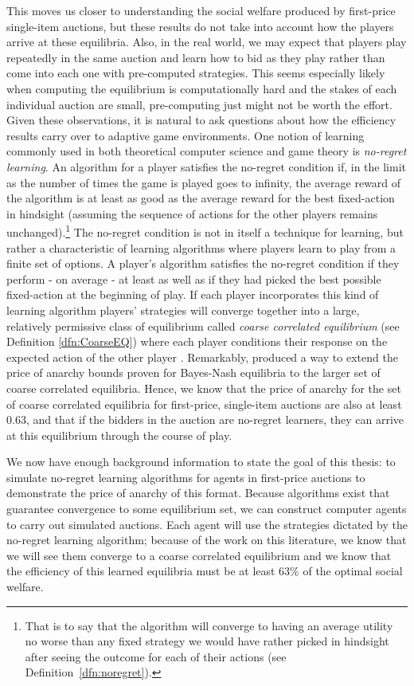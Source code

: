 \documentclass[12pt,twoside]{reedthesis}
\begin{document}
This moves us closer to understanding the social welfare produced by first-price single-item auctions, but these results do not take into account how the players arrive at these equilibria. Also, in the real world, we may expect that players play repeatedly in the same auction and learn how to bid as they play rather than come into each one with pre-computed strategies. This seems especially likely when computing the equilibrium is computationally hard and the stakes of each individual auction are small, pre-computing just might not be worth the effort. Given these observations, it is natural to ask questions about how the efficiency results carry over to adaptive game environments. One notion of learning commonly used in both theoretical computer science and game theory is {\em no-regret learning}. An algorithm for a player satisfies the no-regret condition if, in the limit as the number of times the game is played goes to infinity, the average reward of the algorithm is at least as good as the average reward for the best fixed-action in hindsight (assuming the sequence of actions for the other players remains unchanged).\footnote{That is to say that the algorithm will converge to having an average utility no worse than any fixed strategy we would have rather picked in hindsight after seeing the outcome for each of their actions (see Definition~\ref{dfn:noregret}).} The no-regret condition is not in itself a technique for learning, but rather a characteristic of learning algorithms where players learn to play from a finite set of options. A player's algorithm satisfies the no-regret condition if they perform - on average - at least as well as if they had picked the best possible fixed-action at the beginning of play. If each player incorporates this kind of learning algorithm players' strategies will converge together into a large, relatively permissive class of equilibrium called {\em coarse correlated equilibrium} (see Definition \ref{dfn:CoarseEQ}) where each player conditions their response on the expected action of the other player \citep{Blum2007}. Remarkably, \cite{Roughgarden2017} produced a way to extend the price of anarchy bounds proven for Bayes-Nash equilibria to the larger set of coarse correlated equilibria. Hence, we know that the price of anarchy for the set of coarse correlated equilibria for first-price, single-item auctions are also at least 0.63, and that if the bidders in the auction are no-regret learners, they can arrive at this equilibrium through the course of play.

We now have enough background information to state the goal of this thesis: to simulate no-regret learning algorithms for agents in first-price auctions to demonstrate the price of anarchy of this format. Because algorithms exist that guarantee convergence to some equilibrium set, we can construct computer agents to carry out simulated auctions. Each agent will use the strategies dictated by the no-regret learning algorithm; because of the work on this literature, we know that we will see them converge to a coarse correlated equilibrium and we know that the efficiency of this learned equilibria must be at least 63\% of the optimal social welfare.
\end{document}
